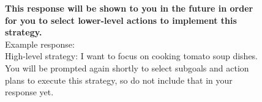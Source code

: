 \documentclass{article} %
\begin{document}
\begin{figure}[H]
\begin{tcolorbox}
\textbf{This response will be shown to you in the future in order for you to select lower-level actions to implement this strategy.}\\
Example response:\\
High-level strategy: I want to focus on cooking tomato soup dishes.\\
You will be prompted again shortly to select subgoals and action plans to execute this strategy, so do not include that in your response yet.

\end{tcolorbox}

\end{figure}

\begin{tcolorbox}[
    title={\small \textbf{Subgoal Module Message}},
    width=\linewidth, %
    fontupper=\fontsize{9pt}{11pt}\selectfont\ttfamily
] %


\end{tcolorbox}
\end{document}
